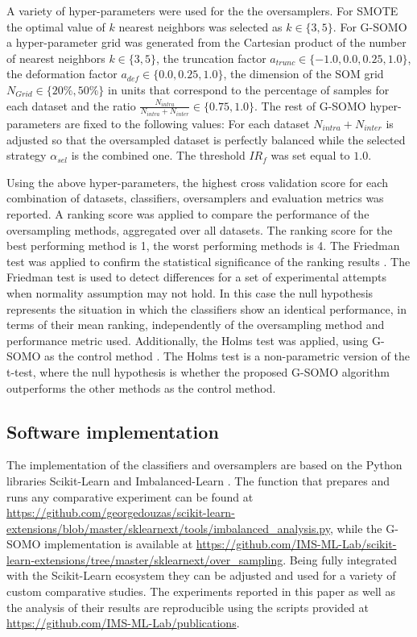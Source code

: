 \documentclass[parskip=full]{scrartcl}
\begin{document}
A variety of hyper-parameters were used for the the oversamplers. For SMOTE the
optimal value of $k$ nearest neighbors was selected as $k \in \{3, 5 \}$. For
G-SOMO a hyper-parameter grid was generated from the Cartesian product of the
number of nearest neighbors $k \in \{3, 5\}$, the truncation factor 
$a_{trunc} \in \{−1.0, 0.0, 0.25, 1.0 \}$, the deformation factor $a_{def} \in \{0.0, 0.25, 1.0\}$, 
the dimension of the SOM grid $N_{Grid} \in \{20\%, 50\% \}$ in units
that correspond to the percentage of samples for each dataset and the ratio
$\frac{N_{intra}}{N_{intra} + N_{inter}} \in \{0.75, 1.0 \}$. The rest of G-SOMO
hyper-parameters are fixed to the following values: For each dataset $N_{intra} + N_{inter}$ 
is adjusted so that the oversampled dataset is perfectly balanced
while the selected strategy $\alpha_{sel}$ is the combined one. The threshold
$IR_{f}$ was set equal to $1.0$. 

Using the above hyper-parameters, the highest cross validation score for each
combination of datasets, classifiers, oversamplers and evaluation metrics was
reported. A ranking score was applied to compare the performance of the
oversampling methods, aggregated over all datasets. The ranking score for the
best performing method is 1, the worst performing methods is 4. The Friedman
test was applied to confirm the statistical significance of the ranking results
\cite{Guyon2003}. The Friedman test is used to detect differences for a set of
experimental attempts when normality assumption may not hold. In this case the
null hypothesis represents the situation in which the classifiers show an
identical performance, in terms of their mean ranking, independently of the
oversampling method and performance metric used. Additionally, the Holms test
was applied, using G-SOMO as the control method \cite{Guyon2003}. The Holms test
is a non-parametric version of the t-test, where the null hypothesis is whether
the proposed G-SOMO algorithm outperforms the other methods as the control
method.

\subsection{Software implementation}

The implementation of the classifiers and oversamplers are based on the Python
libraries Scikit-Learn \cite{Pedregosa2012} and Imbalanced-Learn
\cite{Lemaitre2016}. The function that prepares and runs any comparative
experiment can be found at
\url{https://github.com/georgedouzas/scikit-learn-extensions/blob/master/sklearnext/tools/imbalanced_analysis.py},
while the G-SOMO implementation is available at
\url{https://github.com/IMS-ML-Lab/scikit-learn-extensions/tree/master/sklearnext/over_sampling}.
Being fully integrated with the Scikit-Learn ecosystem they can be adjusted and
used for a variety of custom comparative studies. The experiments reported in
this paper as well as the analysis of their results are reproducible using the
scripts provided at \url{https://github.com/IMS-ML-Lab/publications}.
\end{document}
